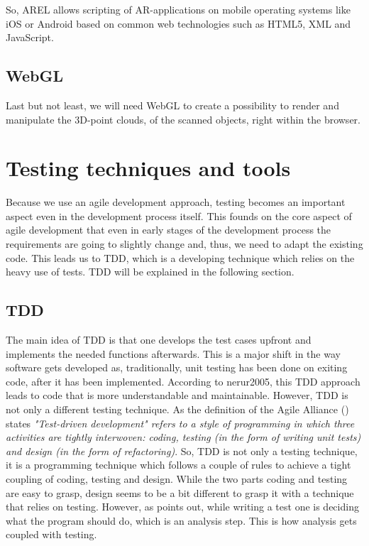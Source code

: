 So, \ac{AREL} allows scripting of \ac{AR}-applications on mobile operating systems like iOS or Android based on common web technologies such as \ac{HTML5}, \ac{XML} and JavaScript. 

\subsection{WebGL}
Last but not least, we will need \ac{WebGL} to create a possibility to render and manipulate the 3D-point clouds, of the scanned objects, right within the browser.

\section{Testing techniques and tools}	
Because we use an agile development approach, testing becomes an important aspect even in the development process itself. This founds on the core aspect of agile development that even in early stages of the development process the requirements are going to slightly change and, thus, we need to adapt the existing code. This leads us to \ac{TDD}, which is a developing technique which relies on the heavy use of tests. \ac{TDD} will be explained in the following section. 

\subsection{TDD}
The main idea of \ac{TDD} is that one develops the test cases upfront and implements the needed functions afterwards. This is a major shift in the way software gets developed as, traditionally, unit testing has been done on exiting code, after it has been implemented. According to \ac{nerur2005}, this \ac{TDD} approach leads to code that is more understandable and maintainable. However, \ac{TDD} is not only a different testing technique. As the definition of the Agile Alliance (\cite{GAA2015}) states \textit{"Test-driven development" refers to a style of programming in which three activities are tightly interwoven: coding, testing (in the form of writing unit tests) and design (in the form of refactoring)}. So, \ac{TDD} is not only a testing technique, it is a programming technique which follows a couple of rules to  achieve a tight coupling of coding, testing and design. While the two parts coding and testing are easy to grasp, design seems to be a bit different to grasp it with a technique that relies on testing. However, as \cite{Janzen2005} points out, while writing a test one is deciding what the program should do, which is an analysis step. This is how analysis gets coupled with testing.

